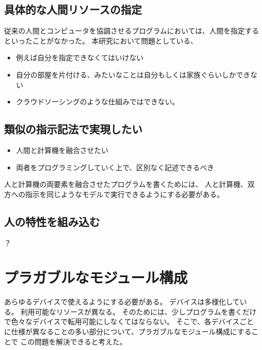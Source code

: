 \subsection{具体的な人間リソースの指定}\label{ux5177ux4f53ux7684ux306aux4ebaux9593ux30eaux30bdux30fcux30b9ux306eux6307ux5b9a}

従来の人間とコンピュータを協調させるプログラムにおいては、人間を指定するといったことがなかった。
本研究において問題としている、

\begin{itemize}
\itemsep1pt\parskip0pt
\item
  例えば自分を指定できなくてはいけない
\item
  自分の部屋を片付ける、みたいなことは自分もしくは家族ぐらいしかできない
\item
  クラウドソーシングのような仕組みではできない。
\end{itemize}

\subsection{類似の指示記法で実現したい}\label{ux985eux4f3cux306eux6307ux793aux8a18ux6cd5ux3067ux5b9fux73feux3057ux305fux3044}

\begin{itemize}
\itemsep1pt\parskip0pt
\item
  人間と計算機を融合させたい
\item
  両者をプログラミングしていく上で、区別なく記述できるべき
\end{itemize}

人と計算機の両要素を融合させたプログラムを書くためには、
人と計算機、双方への指示を同じようなモデルで実行できるようにする必要がある。

\subsection{人の特性を組み込む}\label{ux4ebaux306eux7279ux6027ux3092ux7d44ux307fux8fbcux3080}

？

\section{プラガブルなモジュール構成}\label{ux30d7ux30e9ux30acux30d6ux30ebux306aux30e2ux30b8ux30e5ux30fcux30ebux69cbux6210}

あらゆるデバイスで使えるようにする必要がある。
デバイスは多様化している。 利用可能なリソースが異なる。
そのためには、少しプログラムを書くだけで色々なデバイスで転用可能にしなくてはならない。
そこで、各デバイスごとに仕様が異なることの多い部分について、プラガブルなモジュール構成にすることで
この問題を解決できると考えた。

